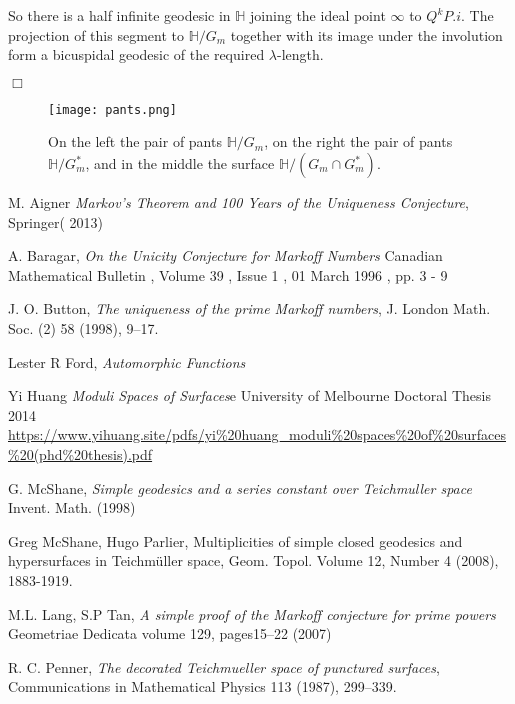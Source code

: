 \documentclass[12pt,a4paper]{amsart}
\def\HH{\mathbb{H}}
\def\GG{G_m}
\begin{document}
So there is a half infinite geodesic in $\HH$ joining the ideal point $\infty$
to $Q^kP.i$. The projection of this segment to $\HH/\GG$ together with its image
under the involution form a bicuspidal geodesic of the required
$\lambda$-length.

\hfill$\Box$


\begin{figure}[ht]
\begin{center}
\texttt{[image: pants.png]}
\end{center}
\caption{On the left the pair of pants $\HH/\GG$,
	on the right  the pair of pants $\HH/\GG^*$,
and in the middle the surface $\HH/(\GG\cap \GG^*)$.}
\label{fig: pants}
\end{figure}


M. Aigner
\textit{Markov's Theorem and 100 Years of the Uniqueness Conjecture}, Springer( 2013)

A. Baragar,
\textit{On the Unicity Conjecture for Markoff Numbers}
Canadian Mathematical Bulletin , Volume 39 , Issue 1 , 01 March 1996 , pp. 3 - 9

J. O. Button, 
\textit{The uniqueness of the prime Markoff numbers},
 J. London Math. Soc.
(2) 58 (1998), 9–17.



Lester R Ford,
\textit{Automorphic Functions}

Yi Huang
\textit{Moduli Spaces of Surfaces}e University of Melbourne Doctoral Thesis 2014
\url{https://www.yihuang.site/pdfs/yi%20huang_moduli%20spaces%20of%20surfaces%20(phd%20thesis).pdf}

G. McShane,
\textit{Simple geodesics and a series constant over Teichmuller space}
Invent. Math. (1998)

Greg McShane, Hugo Parlier,
Multiplicities of simple closed geodesics and hypersurfaces in Teichmüller space,
Geom. Topol.
Volume 12, Number 4 (2008), 1883-1919.

M.L. Lang, S.P Tan,
\textit{A simple proof of the Markoff conjecture for prime powers}
Geometriae Dedicata volume 129, pages15–22 (2007)

R. C. Penner, 
\textit{The decorated Teichmueller space of punctured surfaces}, 
Communications in Mathematical Physics 113 (1987), 299–339.
\end{document}
